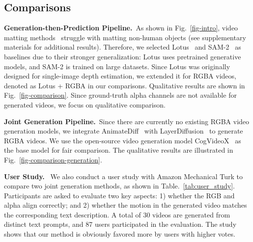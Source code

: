 \subsection{Comparisons}

\noindent\textbf{Generation-then-Prediction Pipeline.}~As shown in Fig.~\ref{fig-intro}, video matting methods~\cite{lin2021real,qin2023bimatting,yao2024matte} struggle with matting non-human objects (see supplementary materials for additional results). Therefore, we selected Lotus~\cite{he2024lotus} and SAM-2~\cite{ravi2024sam2} as baselines due to their stronger generalization: Lotus uses pretrained generative models, and SAM-2 is trained on large datasets. Since Lotus was originally designed for single-image depth estimation, we extended it for RGBA videos, denoted as Lotus + RGBA in our comparisons. Qualitative results are shown in Fig.~\ref{fig-comparison}. Since ground-truth alpha channels are not available for generated videos, we focus on qualitative comparison. 


\vspace{0.5em}
\noindent\textbf{Joint Generation Pipeline.}~Since there are currently no existing RGBA video generation models, we integrate AnimateDiff~\cite{guo2023animatediff} with LayerDiffusion~\cite{zhang2024transparent} to generate RGBA videos. We use the open-source video generation model CogVideoX~\cite{yang2024cogvideox} as the base model for fair comparison. 
The qualitative results are illustrated in Fig.~\ref{fig-comparison-generation}.


\vspace{0.5em}
\noindent\textbf{User Study.}~
We also conduct a user study with Amazon Mechanical Turk to compare two joint generation methods, as shown in Table.~\ref{tab:user_study}. Participants are asked to evaluate two key aspects: 1) whether the RGB and alpha align correctly; and 2) whether the motion in the generated video matches the corresponding text description. A total of 30 videos are generated from distinct text prompts, and 87 users participated in the evaluation. The study shows that our method is obviously favored more by users with higher votes.


